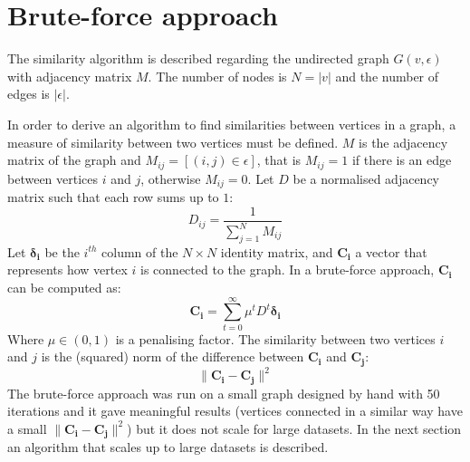 \documentclass[12pt]{report}
\begin{document}
\section{Brute-force approach}
%
The similarity algorithm is described regarding the undirected graph $G(v, \epsilon)$
with adjacency matrix $M$. The number of nodes is $N = |v|$ and the number of
edges is $|\epsilon|$.


In order to derive an algorithm to find similarities between vertices in a graph,
a measure of similarity between two vertices must be defined. $M$ is the adjacency
matrix of the graph and $M_{i j} = [(i,j) \in \epsilon]$, that is $M_{i j} = 1$
if there is an edge between vertices $i$ and $j$, otherwise $M_{i j} = 0$. Let
$D$ be a normalised adjacency matrix such that each row sums up to $1$:
%
\begin{equation}
\label{eq:initial-d}
D_{i j} = \frac{1}{\sum_{j=1}^N M_{ij}}
\end{equation}
%
Let $\mathbf{\delta_i}$ be the $i^{th}$ column of the $N \times N$ identity matrix,
and $\mathbf{C_i}$ a vector that represents how vertex $i$ is connected to the graph.
In a brute-force approach, $\mathbf{C_i}$ can be computed as:
%
\begin{equation}
\label{eq:brute-ci}
\mathbf{C_i} = \sum_{t=0}^\infty \mu^t D^t \mathbf{\delta_i}
\end{equation}
%
Where $\mu \in (0,1)$ is a penalising factor. The similarity between two vertices
$i$ and $j$ is the (squared) norm of the difference between $\mathbf{C_i}$ and
$\mathbf{C_j}$:
%
\begin{equation}
\|\mathbf{C_i} - \mathbf{C_j}\|^2
\end{equation}
%
The brute-force approach was run on a small graph designed by hand with 50 iterations
and it gave meaningful results (vertices connected in a similar way have a small
$\|\mathbf{C_i} - \mathbf{C_j}\|^2$) but it does not scale for large datasets. In
the next section an algorithm that scales up to large datasets is described.

%
%
\end{document}
